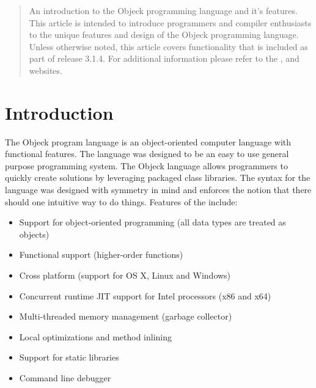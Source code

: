 \documentclass[11pt]{article}
\begin{document}
\maketitle
\thispagestyle{empty}

\vspace{\baselineskip}

\begin{abstract}
  An introduction to the Objeck programming language and it's
  features.  This article is intended to introduce programmers and
  compiler enthusiasts to the unique features and design of the Objeck
  programming language.  Unless otherwise noted, this article covers
  functionality that is included as part of release 3.1.4.  For
  additional information please refer to the
  , 
and  websites.
\end{abstract}

\newpage
\tableofcontents
\newpage

\label{Introduction}
\section{Introduction}
The Objeck program language is an object-oriented computer language
with functional features.  The language was designed to be an easy to
use general purpose programming system.  The Objeck language allows
programmers to quickly create solutions by leveraging packaged class
libraries.  The syntax for the language was designed with symmetry in
mind and enforces the notion that there should one intuitive way to do
things. Features of the include:
\begin{itemize}
\item Support for object-oriented programming (all data types are
  treated as objects)
\item Functional support (higher-order functions)
\item Cross platform (support for OS X, Linux and Windows)
\item Concurrent runtime JIT support for Intel processors (x86 and x64)
\item Multi-threaded memory management (garbage collector)
\item Local optimizations and method inlining
\item Support for static libraries
\item Command line debugger
\end{itemize}
\end{document}
